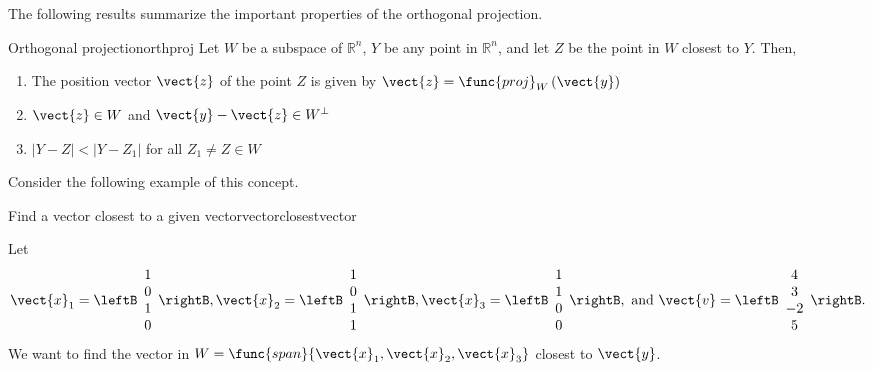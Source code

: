 The following results summarize the important properties of the orthogonal projection. 

\begin{theorem}{Orthogonal projection}{orthproj}
Let $W$ be a subspace of $\mathbb{R}^n$, $Y$ be any point in $\mathbb{R}^n$, and let $Z$ be the point in $W$ closest to $Y$. Then, 
\begin{enumerate}
\item 
The position vector $\vect{z}$ of the point $Z$ is given by $\vect{z} = \func{proj}_{W}\left( \vect{y}\right)$
\item
$\vect{z} \in W$ and $\vect{y} - \vect{z} \in W^{\perp}$
\item
$| Y - Z | < | Y - Z_1 |$ for all $Z_1 \neq Z \in W$
\end{enumerate}
\end{theorem}

Consider the following example of this concept.

\begin{example}{Find a vector closest to a given vector}{vectorclosestvector}

Let
\[ \vect{x}_1=\leftB\begin{array}{c} 1\\ 0\\ 1\\ 0 \end{array}\rightB,
\vect{x}_2=\leftB\begin{array}{c} 1\\ 0\\ 1\\ 1 \end{array}\rightB,
\vect{x}_3=\leftB\begin{array}{c} 1\\ 1\\ 0\\ 0 \end{array}\rightB,
\mbox{ and }
\vect{v}=\leftB\begin{array}{c} 4\\ 3\\ -2\\ 5 \end{array}\rightB. \]
We want to find the vector in
$W =\func{span}\{\vect{x}_1, \vect{x}_2,\vect{x}_3\}$
closest to $\vect{y}$.
\end{example}

